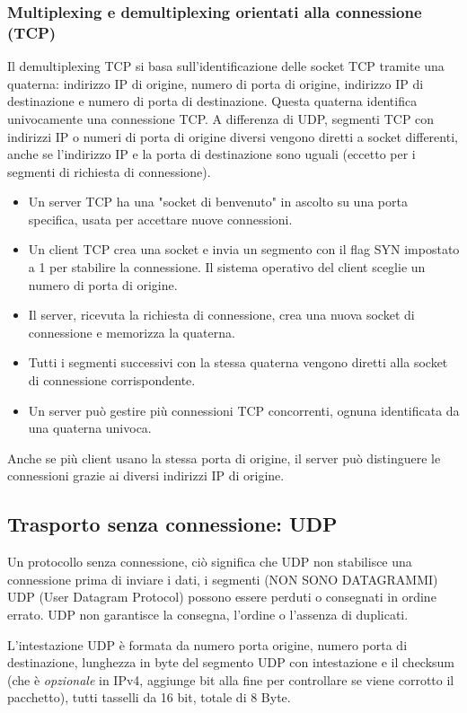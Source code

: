 \subsubsection*{Multiplexing e demultiplexing orientati alla connessione (TCP)}
Il demultiplexing TCP si basa sull'identificazione delle socket TCP tramite una quaterna: indirizzo IP di origine, numero di porta di origine, indirizzo IP di destinazione e numero di porta di destinazione. Questa quaterna identifica univocamente una connessione TCP. A differenza di UDP, segmenti TCP con indirizzi IP o numeri di porta di origine diversi vengono diretti a socket differenti, anche se l'indirizzo IP e la porta di destinazione sono uguali (eccetto per i segmenti di richiesta di connessione).
\begin{itemize}
    \item Un server TCP ha una "socket di benvenuto" in ascolto su una porta specifica, usata per accettare nuove connessioni.
    \item Un client TCP crea una socket e invia un segmento con il flag SYN impostato a 1 per stabilire la connessione. Il sistema operativo del client sceglie un numero di porta di origine.
    \item Il server, ricevuta la richiesta di connessione, crea una nuova socket di connessione e memorizza la quaterna.
    \item Tutti i segmenti successivi con la stessa quaterna vengono diretti alla socket di connessione corrispondente.
    \item Un server può gestire più connessioni TCP concorrenti, ognuna identificata da una quaterna univoca.
\end{itemize}
Anche se più client usano la stessa porta di origine, il server può distinguere le connessioni grazie ai diversi indirizzi IP di origine.

\subsection{Trasporto senza connessione: UDP}
Un protocollo senza connessione, ciò significa che UDP non stabilisce una connessione prima di inviare i dati, i segmenti (NON SONO DATAGRAMMI) UDP (User Datagram Protocol) possono essere perduti o consegnati in ordine errato. UDP non garantisce la consegna, l'ordine o l'assenza di duplicati.

L'intestazione UDP è formata da numero porta origine, numero porta di destinazione, lunghezza in byte del segmento UDP con intestazione e il checksum (che è \textit{opzionale} in IPv4, aggiunge bit alla fine per controllare se viene corrotto il pacchetto), tutti tasselli da 16 bit, totale di 8 Byte.

